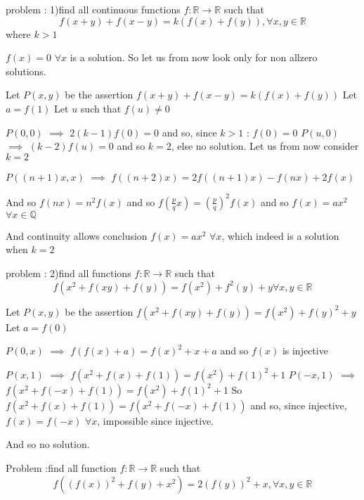 \begin{solution}
	\begin{tcolorbox}problem :
1)find all continuous functions $f:\mathbb{R}\to\mathbb{R}$ such that 
\[f(x+y)+f(x-y)=k(f(x)+f(y)),\forall x,y\in\mathbb{R}\]where $k> 1$\end{tcolorbox}
$\boxed{f(x)=0}$ $\forall x$ is a solution. So let us from now look only for non allzero solutions.

Let $P(x,y)$ be the assertion $f(x+y)+f(x-y)=k(f(x)+f(y))$
Let $a=f(1)$
Let $u$ such that $f(u)\ne 0$

$P(0,0)$ $\implies$ $2(k-1)f(0)=0$ and so, since $k>1$ : $f(0)=0$
$P(u,0)$ $\implies$ $(k-2)f(u)=0$ and so $k=2$, else no solution.
Let us from now consider $k=2$

$P((n+1)x,x)$ $\implies$ $f((n+2)x)=2f((n+1)x)-f(nx)+2f(x)$

And so $f(nx)=n^2f(x)$ and so $f(\frac pqx)=\left(\frac pq\right)^2f(x)$ and so $f(x)=ax^2$ $\forall x\in \mathbb Q$

And continuity allows conclusion $\boxed{f(x)=ax^2}$ $\forall x$, which indeed is a solution when $k=2$
\end{solution}



\begin{solution}
	\begin{tcolorbox}problem :
2)find all  functions $f:\mathbb{R}\to\mathbb{R}$ such that 
\[f(x^2+f(xy)+f(y))=f(x^2)+f^2(y) +y\forall x,y\in\mathbb{R}\]\end{tcolorbox}
Let $P(x,y)$ be the assertion $f(x^2+f(xy)+f(y))=f(x^2)+f(y)^2+y$
Let $a=f(0)$

$P(0,x)$ $\implies$ $f(f(x)+a)=f(x)^2+x+a$ and so $f(x)$ is injective

$P(x,1)$ $\implies$ $f(x^2+f(x)+f(1))=f(x^2)+f(1)^2+1$
$P(-x,1)$ $\implies$ $f(x^2+f(-x)+f(1))=f(x^2)+f(1)^2+1$
So $f(x^2+f(x)+f(1))=f(x^2+f(-x)+f(1))$ and so, since injective, $f(x)=f(-x)$ $\forall x$, impossible since injective.

And so no solution.
\end{solution}



\begin{solution}
	Problem :find all function $f:\mathbb{R}\to\mathbb{R}$ such that 
\[f( (f(x))^2+f(y) + x^2)=2(f(y))^2+x,\forall x,y\in\mathbb{R}\]
\end{solution}



